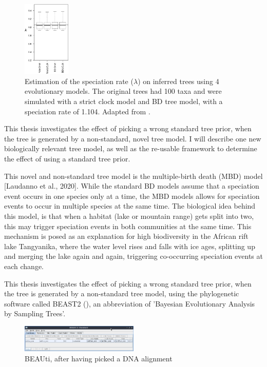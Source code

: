 \begin{figure}[H]
  \includegraphics[width=0.2\textwidth]{sarver2019choice_top_4_bars.png}
  \caption{
    Estimation of the speciation rate ($\lambda$)
    on inferred trees using 4 evolutionary models.
    The original trees had 100 taxa and were simulated with a strict clock model 
    and BD tree model, with a speciation rate of 1.104.
    Adapted from \cite{sarver2019choice}.
 }
  \label{fig:sarver2019choice}
\end{figure}

This thesis investigates the effect of picking a wrong standard
tree prior, when the tree is generated by a non-standard, novel tree model.
I will describe one new biologically relevant tree model, as well as the re-usable framework to determine the effect of using a standard tree prior. 

This novel and non-standard tree model is the multiple-birth 
death (MBD) model [Laudanno et al., 2020].
While the standard BD models assume that a speciation event occurs in one
species only at a time, the MBD models allows for speciation events
to occur in multiple species at the same time.
The biological idea behind this model, is that when a 
habitat (lake or mountain range) gets split into two, 
this may trigger speciation events in both communities at the same time. 
This mechanism is posed as an
explanation for high biodiversity in the African rift lake Tangyanika,
where the water level rises and falls with ice ages,
splitting up and merging the lake again and again, 
triggering co-occurring speciation events at each change. 

%
%
%

This thesis investigates the effect of picking a wrong standard
tree prior, when the tree is generated 
by a non-standard tree model, using the phylogenetic software 
called BEAST2 (\cite{beast2}),
an abbreviation of 'Bayesian Evolutionary Analysis by Sampling Trees'.

\begin{figure}[H]
  \includegraphics[width=0.5\textwidth]{beauti_alignment.png}
  \caption{
    BEAUti, after having picked a DNA alignment
  }
  \label{fig:beauti_alignment}
\end{figure}

